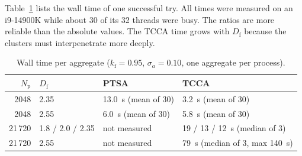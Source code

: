 \documentclass[11pt,a4paper]{article}
\newcommand{\Df}{D_\text{f}}
\newcommand{\kf}{k_\text{f}}
\begin{document}
Table~\ref{tab:speed} lists the wall time of one successful try.
All times were measured on an i9-14900K while about 30 of its 32 threads were busy.
The ratios are more reliable than the absolute values.
The TCCA time grows with $\Df$ because the clusters must interpenetrate more deeply.

\begin{table}[htbp]
  \centering
  \caption{Wall time per aggregate ($\kf = 0.95$, $\sigma_a = 0.10$, one aggregate per process).}
  \label{tab:speed}
  \small
  \begin{tabular}{rlll}
    \toprule
    $N_\text{p}$ & $\Df$ & PTSA & TCCA \\
    \midrule
    2048   & 2.35 & \SI{13.0}{\second} (mean of 30) & \SI{3.2}{\second} (mean of 30) \\
    2048   & 2.55 & \SI{6.0}{\second} (mean of 30)  & \SI{5.8}{\second} (mean of 30) \\
    21\,720 & 1.8 / 2.0 / 2.35 & not measured & 19 / 13 / \SI{12}{\second} (median of 3) \\
    21\,720 & 2.55 & not measured & \SI{79}{\second} (median of 3, max \SI{140}{\second}) \\
    \bottomrule
  \end{tabular}
\end{table}
\end{document}
